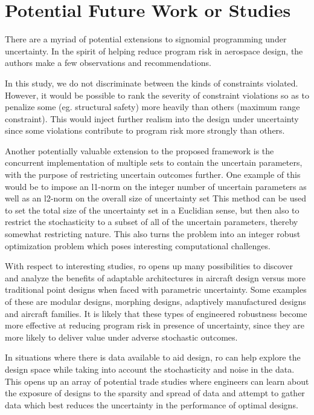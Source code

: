 \section{Potential Future Work or Studies}

There are a myriad of potential extensions to signomial programming under uncertainty.
In the spirit of helping reduce program risk in aerospace design,
the authors make a few observations and recommendations.

In this study, we do not discriminate between the kinds of constraints violated. However, it would
be possible to rank the severity of constraint violations so as to penalize some (eg. structural safety)
more heavily than others (maximum range constraint). This would inject further realism into the
design under uncertainty since some violations contribute to program risk more
strongly than others.

Another potentially valuable extension to the proposed framework is the concurrent implementation
of multiple sets to contain the uncertain parameters, with the purpose of restricting uncertain
outcomes further. One example of this would be to impose an  l1-norm on the integer number of uncertain parameters
as well as an l2-norm on the overall size of uncertainty set
This method can be used to set the total size of the uncertainty set in a Euclidian sense,
but then also to restrict the stochasticity to a subset of all of the uncertain parameters,
thereby somewhat restricting nature. This also turns the problem into an integer robust
optimization problem which poses interesting computational challenges.

With respect to interesting studies, \gls{ro} opens up many possibilities to discover and analyze the benefits
of adaptable architectures in aircraft design versus more traditional point designs
when faced with parametric uncertainty. Some examples of these are modular designs, morphing designs,
adaptively manufactured designs and aircraft families. It is likely that these types of engineered
robustness become more effective at reducing program risk in presence of uncertainty, since they are more likely
to deliver value under adverse stochastic outcomes.

In situations where there is data available to aid design, \gls{ro} can help explore
the design space while taking into account the stochasticity and noise in the data.
This opens up an array of potential trade studies where engineers can learn about
the exposure of designs to the sparsity and spread of data and attempt to gather
data which best reduces the uncertainty in the performance of optimal designs.
